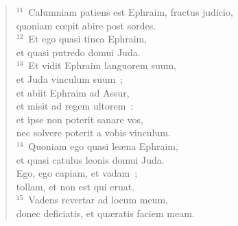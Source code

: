 \begin{verse}
${}^{11}$~Calumniam patiens est Ephraim, fractus judicio,\\ quoniam cœpit abire post sordes.\\
${}^{12}$~Et ego quasi tinea Ephraim,\\ et quasi putredo domui Juda.\\
${}^{13}$~Et vidit Ephraim languorem suum,\\ et Juda vinculum suum~;\\ et abiit Ephraim ad Assur,\\ et misit ad regem ultorem~:\\ et ipse non poterit sanare vos,\\ nec solvere poterit a vobis vinculum.\\
${}^{14}$~Quoniam ego quasi le\ae na Ephraim,\\ et quasi catulus leonis domui Juda.\\ Ego, ego capiam, et vadam~;\\ tollam, et non est qui eruat.\\
${}^{15}$~Vadens revertar ad locum meum,\\ donec deficiatis, et qu\ae ratis faciem meam.\end{verse}


